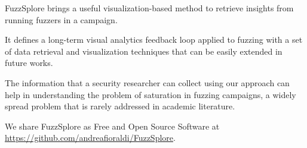 \documentclass[conference,compsoc]{IEEEtran}
\begin{document}
{\sc FuzzSplore} brings a useful visualization-based method to retrieve insights from running fuzzers in a campaign. 

It defines a long-term visual analytics feedback loop applied to fuzzing with a set of data retrieval and visualization techniques that can be easily extended in future works. 

The information that a security researcher can collect using our approach can help in understanding the problem of saturation in fuzzing campaigns, a widely spread problem that is rarely addressed in academic literature.

We share {\sc FuzzSplore} as Free and Open Source Software at \url{https://github.com/andreafioraldi/FuzzSplore}.

\vspace{10mm}



\end{document}

